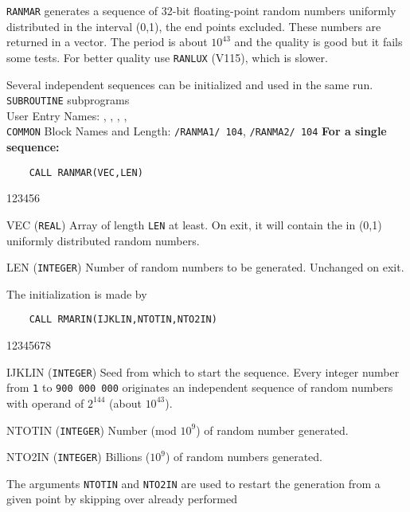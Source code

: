                     
                  
                
{\tt RANMAR} generates a sequence of 32-bit floating-point random
numbers uniformly distributed in the interval (0,1), the end
points excluded. These numbers are returned in a vector.
The period is about $10^{43}$ and the quality is good but it fails
some tests. For better quality use {\tt RANLUX} (V115), which is
slower.
\par
Several independent sequences can be initialized and used
in the same run.
\Structure
{\tt SUBROUTINE} subprograms \\
User Entry Names: , , ,
,  \\
{\tt COMMON} Block Names and Length: {\tt /RANMA1/ 104},
{\tt /RANMA2/ 104}
\Usage
{\bf For a single sequence:}
\begin{verbatim}
    CALL RANMAR(VEC,LEN)
\end{verbatim}
\begin{DLtt}{123456}
\item[VEC] ({\tt REAL}) Array of length {\tt LEN} at least.
On exit, it will contain the in (0,1) uniformly distributed random
numbers.
\item[LEN] ({\tt INTEGER}) Number of random numbers to be generated.
Unchanged on exit.
\end{DLtt}
The initialization is made by
\begin{verbatim}
    CALL RMARIN(IJKLIN,NTOTIN,NTO2IN)
\end{verbatim}
\begin{DLtt}{12345678}
\item[IJKLIN] ({\tt INTEGER}) Seed from which to start the sequence.
Every integer number from {\tt 1} to {\tt 900 000 000} originates
an independent sequence of random numbers with operand of $2^{144}$
(about $10^{43}$).
\item[NTOTIN] ({\tt INTEGER}) Number (mod $10^9$) of random number
generated.
\item[NTO2IN] ({\tt INTEGER}) Billions ($10^9$)
of random numbers generated.
\end{DLtt}
The arguments {\tt NTOTIN} and {\tt NTO2IN} are used to restart the
generation from a given point by skipping over already performed
